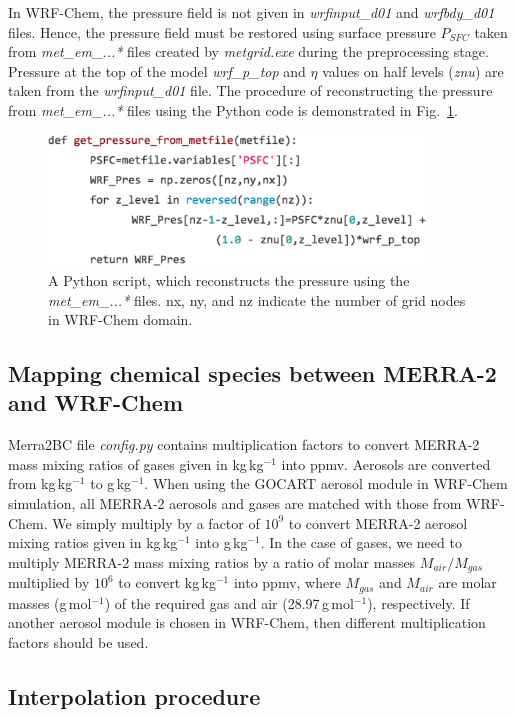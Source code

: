 \documentclass{article}
\begin{document}
In WRF-Chem, the pressure field is not given in \textit{wrfinput\_d01} and \textit{wrfbdy\_d01} files. Hence, the pressure field must be restored using surface pressure $P_{SFC}$ taken from \textit{met\_em\_...*} files created by \textit{metgrid.exe} during the preprocessing stage. Pressure at the top of the model \textit{wrf\_p\_top} and $\eta$ values on half levels (\textit{znu}) are taken from the \textit{wrfinput\_d01} file. The procedure of reconstructing the pressure from \textit{met\_em\_...*} files using the Python code is demonstrated in Fig.~\ref{fig:figA1}.

\begin{figure}[h!]
\centering
\includegraphics[width=10cm]{f1.png}
\caption{A Python script, which reconstructs the pressure using the \textit{met\_em\_...*} files. nx, ny, and nz indicate the number of grid nodes in WRF-Chem domain.}
\label{fig:figA1}
\end{figure}

\subsection{Mapping chemical species between MERRA-2 and WRF-Chem}

{Merra2BC} file \textit{config.py} contains multiplication factors to convert MERRA-2 mass mixing ratios of gases given in kg\,kg$^{-1}$ into \unit{ppmv}. Aerosols are converted from kg\,kg$^{-1}$ to \unit{\mu}g\,kg$^{-1}$. When using the GOCART aerosol module in WRF-Chem simulation, all MERRA-2 aerosols and gases are matched with those from WRF-Chem. We simply multiply by a factor of $10^9$ to convert MERRA-2 aerosol mixing ratios given in kg\,kg$^{-1}$ into \unit{\mu}g\,kg$^{-1}$. In the case of gases, we need to multiply MERRA-2 mass mixing ratios by a ratio of molar masses $M_{air}/M_{gas}$ multiplied by $10^6$ to convert kg\,kg$^{-1}$ into \unit{ppmv}, where $M_{gas}$ and $M_{air}$ are molar masses (g\,mol$^{-1}$) of the required gas and air (28.97\,g\,mol$^{-1}$), respectively. If another aerosol module is chosen in WRF-Chem, then different multiplication factors should be used.

\subsection{Interpolation procedure}
\end{document}
